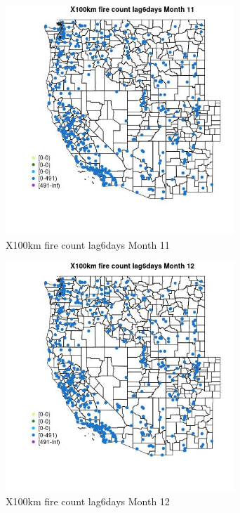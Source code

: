 \begin{figure} 
\centering  
\includegraphics[width=0.77\textwidth]{Code_Outputs/Report_ML_input_PM25_Step4_part_e_de_duplicated_aves_compiled_2019-05-14wNAs_MapObsMo11X100km_fire_count_lag6days.jpg} 
\caption{\label{fig:Report_ML_input_PM25_Step4_part_e_de_duplicated_aves_compiled_2019-05-14wNAsMapObsMo11X100km_fire_count_lag6days}X100km fire count lag6days Month 11} 
\end{figure} 
 

\begin{figure} 
\centering  
\includegraphics[width=0.77\textwidth]{Code_Outputs/Report_ML_input_PM25_Step4_part_e_de_duplicated_aves_compiled_2019-05-14wNAs_MapObsMo12X100km_fire_count_lag6days.jpg} 
\caption{\label{fig:Report_ML_input_PM25_Step4_part_e_de_duplicated_aves_compiled_2019-05-14wNAsMapObsMo12X100km_fire_count_lag6days}X100km fire count lag6days Month 12} 
\end{figure} 
 

